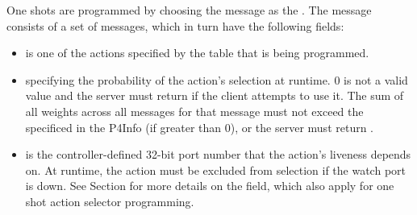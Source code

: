 \documentclass[11pt]{article}
\begin{document}
{%
One shots are programmed by choosing the  message as the
. The  message consists of a set of
 messages, which in turn have the following fields:%

\begin{itemize}%

\item{}
 is one of the actions specified by the table that is being
programmed.%

\item{}
 specifying the probability of the action's selection at runtime. 0 is
not a valid  value and the server must return  if
the client attempts to use it. The sum of all weights across all
 messages for that  message must
not exceed the  specificed in the P4Info (if greater than 0),
or the server must return .%

\item{}
 is the controller-defined 32-bit port number that the action's
liveness depends on. At runtime, the action must be excluded from selection if
the watch port is down. See Section
 for more details on the  field,
which also apply for one shot action selector programming.%
\end{itemize}%

}
\end{document}
